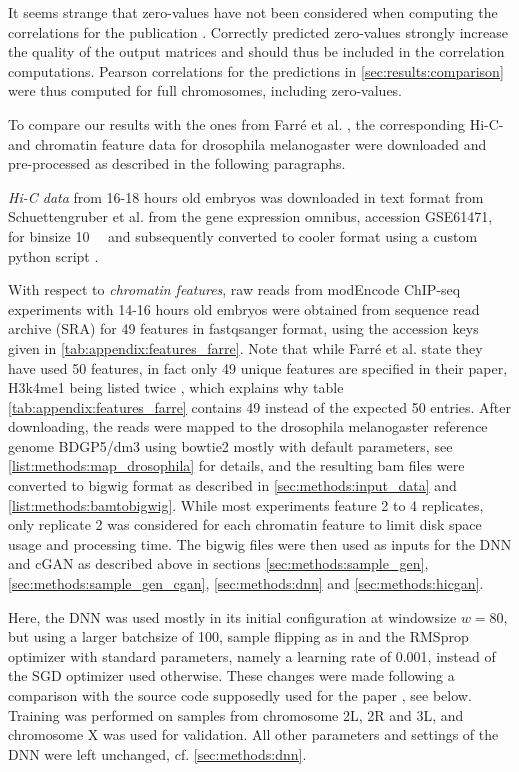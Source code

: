 It seems strange that zero-values have not been considered when computing the correlations for the publication \cite{Zhang2019}.
Correctly predicted zero-values strongly increase the quality of the output matrices 
and should thus be included in the correlation computations.
Pearson correlations for the predictions in \cref{sec:results:comparison} were thus computed for full chromosomes, including zero-values.

To compare our results with the ones from Farr\'e et al. \cite{Farre2018a},
the corresponding Hi-C- and chromatin feature data for drosophila melanogaster were downloaded and pre-processed as described in the following paragraphs.

\emph{Hi-C data} from 16-18 hours old embryos was downloaded in text format from Schuettengruber et al. \cite{Schuettengruber2014} 
from the gene expression omnibus, accession GSE61471, for binsize \SI{10}{\kilo\bp} and subsequently converted to cooler format using a custom python script \cite[scripts/schuettengruberToCooler.py]{Krauth2021b}.

With respect to \emph{chromatin features}, raw reads from modEncode ChIP-seq experiments with 14-16 hours old embryos \cite{Roy2010} 
were obtained from sequence read archive (SRA) for 49 features in fastqsanger format, using the accession keys given in \cref{tab:appendix:features_farre}.
Note that while Farr\'e et al. state they have used 50 features, in fact only 49 unique features are specified in their paper, H3k4me1 being listed twice \cite[p.~9]{Farre2018a},
which explains why table \ref{tab:appendix:features_farre} contains 49 instead of the expected 50 entries.
After downloading, the reads were mapped to the drosophila melanogaster reference genome BDGP5/dm3 using bowtie2 mostly with default parameters, 
see \cref{list:methods:map_drosophila} for details,
and the resulting bam files were converted to bigwig format as described in \cref{sec:methods:input_data} and \cref{list:methods:bamtobigwig}.
While most experiments feature 2 to 4 replicates, only replicate 2 was considered for each chromatin feature to limit disk space usage and processing time.
The bigwig files were then used as inputs for the DNN and cGAN as described above in sections \ref{sec:methods:sample_gen}, \ref{sec:methods:sample_gen_cgan}, \ref{sec:methods:dnn}
and \ref{sec:methods:hicgan}. 

Here, the DNN was used mostly in its initial configuration at windowsize $w=80$,
but using a larger batchsize of 100, sample flipping as in \cite{Farre2018a} and the RMSprop optimizer with standard parameters, namely a learning rate of 0.001,
instead of the SGD optimizer used otherwise.
These changes were made following a comparison with the source code supposedly used for the paper \cite{Farre2018a}, see below.
Training was performed on samples from chromosome 2L, 2R and 3L, and chromosome X was used for validation.
All other parameters and settings of the DNN were left unchanged, cf. \cref{sec:methods:dnn}.

